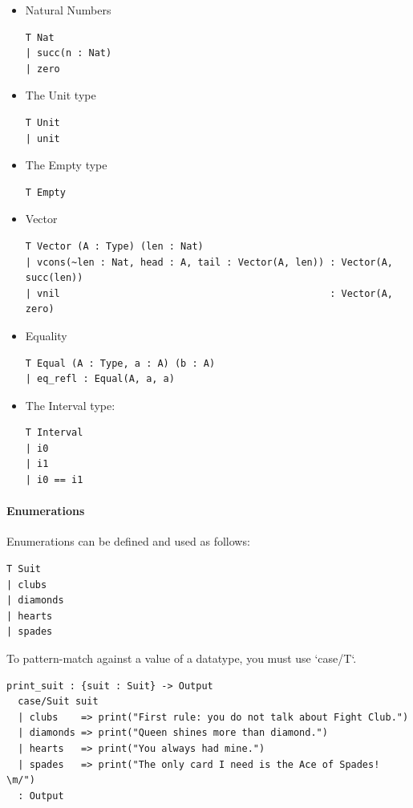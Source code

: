 \documentclass{article}
\theoremstyle{definition}
\theoremstyle{theorem}
\begin{document}
\begin{itemize}
\item Natural Numbers
\begin{lstlisting}
T Nat
| succ(n : Nat)
| zero
\end{lstlisting}

\item The Unit type
\begin{lstlisting}
T Unit
| unit
\end{lstlisting}

\item The Empty type
\begin{lstlisting}
T Empty
\end{lstlisting}

\item Vector
\begin{lstlisting}
T Vector (A : Type) (len : Nat)
| vcons(~len : Nat, head : A, tail : Vector(A, len)) : Vector(A, succ(len))
| vnil                                               : Vector(A, zero)
\end{lstlisting}

\item Equality
\begin{lstlisting}
T Equal (A : Type, a : A) (b : A)
| eq_refl : Equal(A, a, a)
\end{lstlisting}

\item The Interval type:
\begin{lstlisting}
T Interval
| i0
| i1
| i0 == i1
\end{lstlisting}

\end{itemize}

\paragraph{Enumerations}

Enumerations can be defined and used as follows:

\begin{lstlisting}
T Suit
| clubs
| diamonds
| hearts
| spades
\end{lstlisting}

To pattern-match against a value of a datatype, you must use `case/T`.

\begin{lstlisting}
print_suit : {suit : Suit} -> Output
  case/Suit suit
  | clubs    => print("First rule: you do not talk about Fight Club.")
  | diamonds => print("Queen shines more than diamond.")
  | hearts   => print("You always had mine.")
  | spades   => print("The only card I need is the Ace of Spades! \m/")
  : Output
\end{lstlisting}
\end{document}
